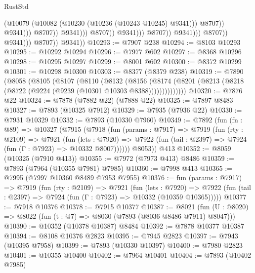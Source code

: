 \begin{lexlean}{RustStd}
\begin{coremodule}
{\begin{coremodule}
{{{{{{{{{{{{{{{{{{{{{{{{{{{{{{{{{{{{{{{{{{{{{{{{{{                                                            (@10079
                                                              (@10082
                                                                (@10230
                                                                  (@10236 (@10243 @10245) @9341)))
                                                              @8707))
                                                          @9341)))
                                                    @8707))
                                                @9341)))
                                          @8707))
                                      @9341)))
                                @8707))
                            @9341)))
                      @8707))
                  @9341)))
            @8707))
        @9341))
@10293 := @7907 @238
@10294 := @8103 @10293
@10295 := @10292 @10294
@10296 := @7977 @602
@10297 := @8368 @10296
@10298 := @10295 @10297
@10299 := @8001 @602
@10300 := @8372 @10299
@10301 := @10298 @10300
@10303 := @8377 (@8379 @238)
@10319 := @7890
    (@8058
      (@8105
        (@8107
          (@8110
            (@8132
              (@8156
                (@8174 (@8201 (@8213 (@8218 (@8722 (@9224 (@9239 (@10301 @10303 @8388))))))))))))))
@10320 := @7876 @22
@10324 := @7878 (@7882 @22) (@7888 @22)
@10325 := @7897 @8483
@10327 := @7893 (@10325 @7912)
@10329 := @7935 (@7936 @22)
@10330 := @7931 @10329
@10332 := @7893 (@10330 @7960)
@10349 := @7892
    (fun (fn : @89) =>
    @10327
      (@7915
        (@7918
          (fun (params : @7917) =>
          @7919
            (fun (rty : @2109) =>
            @7921
              (fun (lets : @7920) =>
              @7922 (fun (tail : @2397) => @7924 (fun (Γ : @7923) => @10332 @8007))))))
        @8053))
    @413
@10352 := @8059 (@10325 (@7910 @413))
@10355 := @7972 (@7973 @413) @8486
@10359 := @7893 (@7964 (@10355 @7981) @7985)
@10360 := @7998 @413
@10365 := @7995 (@7997 @10360 @8489 @7953 @7955)
@10376 := fun (params : @7917) =>
  @7919
    (fun (rty : @2109) =>
    @7921
      (fun (lets : @7920) =>
      @7922 (fun (tail : @2397) => @7924 (fun (Γ : @7923) => @10332 (@10359 @10365)))))
@10377 := @7918 @10376
@10378 := @7915 @10377
@10387 := @8021 (fun (U : @8020) => @8022 (fun (t : @7) => @8030 (@7893 (@8036 @8486 @7911) @8047)))
@10390 := @10352 (@10378 @10387) @8484
@10392 := @7878 @10377 @10387
@10394 := @8108 @10376 @2823
@10395 := @7945 @2823
@10397 := @7943 (@10395 @7958)
@10399 := @7893 (@10330 @10397)
@10400 := @7980 @2823
@10401 := @10355 @10400
@10402 := @7964 @10401
@10404 := @7893 (@10402 @7985)
}}}}}}}}}}}}}}}}}}}}}}}}}}}}}}}}}}}}}}}}}}}}}}}}}}
\end{coremodule}}
\end{coremodule}
\end{lexlean}

